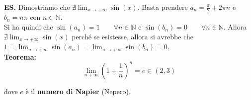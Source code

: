 \documentclass{article}
\begin{document}
\noindent\textbf{ES.} Dimostriamo che $\nexists \lim_{x \to +\infty} \sin(x)$. Basta prendere $a_n = \frac{\pi}{2} + 2\pi n$ e $b_n = n\pi$ con $n \in \mathbb{N}$.\\
Si ha quindi che $\sin(a_n) = 1 \qquad \forall n \in \mathbb{N}$ e $\sin(b_n) = 0 \qquad \forall n \in \mathbb{N}$. Allora $\nexists \lim_{x \to +\infty} \sin(x)$ perché se esistesse, allora si avrebbe che $1 = \lim_{n \to +\infty} \sin(a_n) = \lim_{n \to +\infty} \sin(b_n) = 0$.\\

\noindent\textbf{Teorema:}
\begin{equation*}
    \lim_{n +\infty} \left(1 + \frac{1}{n}\right)^n = e \in (2, 3)
\end{equation*}

\noindent dove $e$ è il \textbf{numero di Napier} (Nepero).
\end{document}
